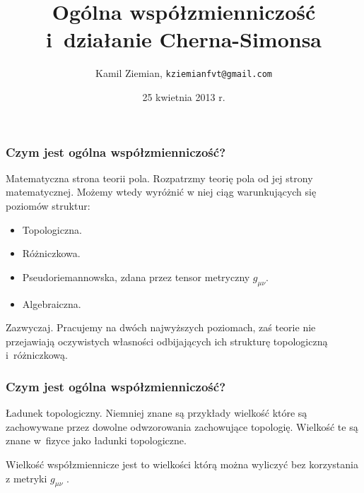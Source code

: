 \documentclass[10pt,t]{beamer}
\title{Ogólna współzmienniczość i~działanie Cherna-Simonsa}
\author{Kamil Ziemian,
  \texttt{kziemianfvt@gmail.com}}
\institute{II rok, fizyka teoretyczna, studia magisterskie}
\date[25 IV 2013]{25 kwietnia 2013 r.}
\begin{document}






\RaggedRight





\maketitle





\begin{frame}
  \frametitle{Czym jest ogólna współzmienniczość?}


  Matematyczna strona teorii pola.
  Rozpatrzmy teorię pola od jej strony matematycznej. Możemy wtedy
  wyróżnić w niej ciąg warunkujących się poziomów struktur:
  \begin{itemize}

  \item Topologiczna.

  \item Różniczkowa.

  \item Pseudoriemannowska, zdana przez tensor metryczny $g_{ \mu \nu }$.

  \item Algebraiczna.

  \end{itemize}



  Zazwyczaj. Pracujemy na dwóch najwyższych poziomach, zaś teorie nie
  przejawiają oczywistych własności odbijających ich strukturę
  topologiczną i~różniczkową.

\end{frame}





\begin{frame}
  \frametitle{Czym jest ogólna współzmienniczość?}


  Ładunek topologiczny. Niemniej znane są przykłady wielkość które są
  zachowywane przez dowolne odwzorowania zachowujące topologię. Wielkość
  te są znane w~fizyce jako ładunki topologiczne.

  Wielkość współzmiennicze jest to wielkości którą można wyliczyć bez
  korzystania z metryki $g_{ \mu \nu }$ \cite{WittenQFTAndJonesPolynomial1989}.

\end{frame}
\end{document}
